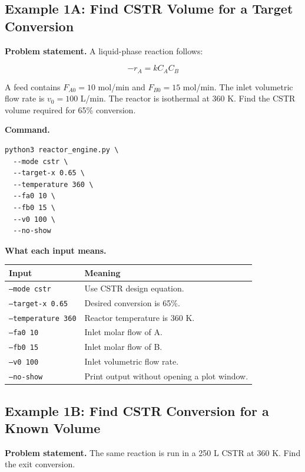 \documentclass[11pt]{article}
\begin{document}
\subsection{Example 1A: Find CSTR Volume for a Target Conversion}

\textbf{Problem statement.} A liquid-phase reaction follows:

\begin{equation}
-r_A = k C_A C_B
\end{equation}

A feed contains $F_{A0}=10$ mol/min and $F_{B0}=15$ mol/min. The inlet volumetric flow rate is $v_0=100$ L/min. The reactor is isothermal at 360 K. Find the CSTR volume required for 65\% conversion.

\textbf{Command.}

\begin{lstlisting}
python3 reactor_engine.py \
  --mode cstr \
  --target-x 0.65 \
  --temperature 360 \
  --fa0 10 \
  --fb0 15 \
  --v0 100 \
  --no-show
\end{lstlisting}

\textbf{What each input means.}

\begin{center}
\begin{tabular}{ll}
\toprule
\textbf{Input} & \textbf{Meaning} \\
\midrule
\texttt{--mode cstr} & Use CSTR design equation. \\
\texttt{--target-x 0.65} & Desired conversion is 65\%. \\
\texttt{--temperature 360} & Reactor temperature is 360 K. \\
\texttt{--fa0 10} & Inlet molar flow of A. \\
\texttt{--fb0 15} & Inlet molar flow of B. \\
\texttt{--v0 100} & Inlet volumetric flow rate. \\
\texttt{--no-show} & Print output without opening a plot window. \\
\bottomrule
\end{tabular}
\end{center}

\subsection{Example 1B: Find CSTR Conversion for a Known Volume}

\textbf{Problem statement.} The same reaction is run in a 250 L CSTR at 360 K. Find the exit conversion.
\end{document}
